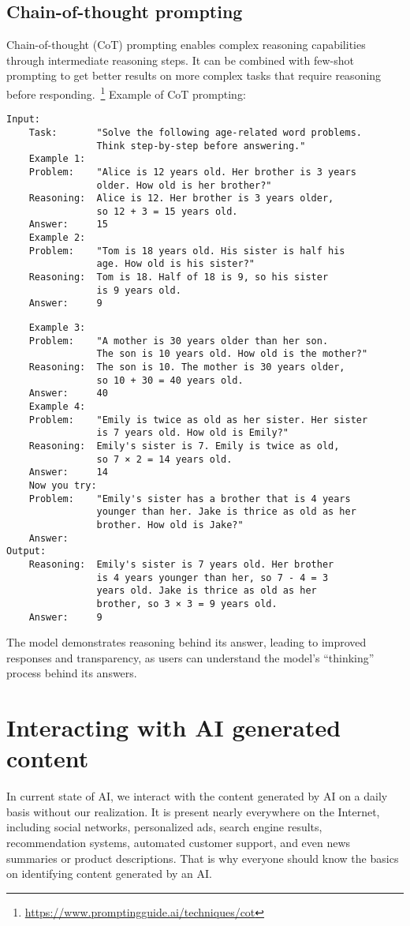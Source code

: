 \subsection*{Chain-of-thought prompting}
Chain-of-thought (CoT) prompting enables complex reasoning capabilities through intermediate reasoning steps. It can be combined with few-shot prompting to get better results on more complex tasks that require reasoning before responding.~\footnote{\url{https://www.promptingguide.ai/techniques/cot}} Example of CoT prompting:
\begin{verbatim}
Input:
    Task:       "Solve the following age-related word problems.
                Think step-by-step before answering."
    Example 1:
    Problem:    "Alice is 12 years old. Her brother is 3 years
                older. How old is her brother?"
    Reasoning:  Alice is 12. Her brother is 3 years older, 
                so 12 + 3 = 15 years old.
    Answer:     15
    Example 2:
    Problem:    "Tom is 18 years old. His sister is half his
                age. How old is his sister?"
    Reasoning:  Tom is 18. Half of 18 is 9, so his sister 
                is 9 years old.
    Answer:     9
\end{verbatim}
\clearpage
\begin{verbatim}
    Example 3:
    Problem:    "A mother is 30 years older than her son. 
                The son is 10 years old. How old is the mother?"
    Reasoning:  The son is 10. The mother is 30 years older, 
                so 10 + 30 = 40 years old.
    Answer:     40
    Example 4:
    Problem:    "Emily is twice as old as her sister. Her sister
                is 7 years old. How old is Emily?"
    Reasoning:  Emily's sister is 7. Emily is twice as old, 
                so 7 × 2 = 14 years old.
    Answer:     14
    Now you try:
    Problem:    "Emily's sister has a brother that is 4 years 
                younger than her. Jake is thrice as old as her 
                brother. How old is Jake?"
    Answer: 
Output:
    Reasoning:  Emily's sister is 7 years old. Her brother 
                is 4 years younger than her, so 7 - 4 = 3 
                years old. Jake is thrice as old as her 
                brother, so 3 × 3 = 9 years old. 
    Answer:     9
\end{verbatim}

The model demonstrates reasoning behind its answer, leading to improved responses and transparency, as users can understand the model's ``thinking'' process behind its answers.

\section{Interacting with AI generated content}
In current state of AI, we interact with the content generated by AI on a daily basis without our realization. It is present nearly everywhere on the Internet, including social networks, personalized ads, search engine results, recommendation systems, automated customer support, and even news summaries or product descriptions. That is why everyone should know the basics on identifying content generated by an AI.

